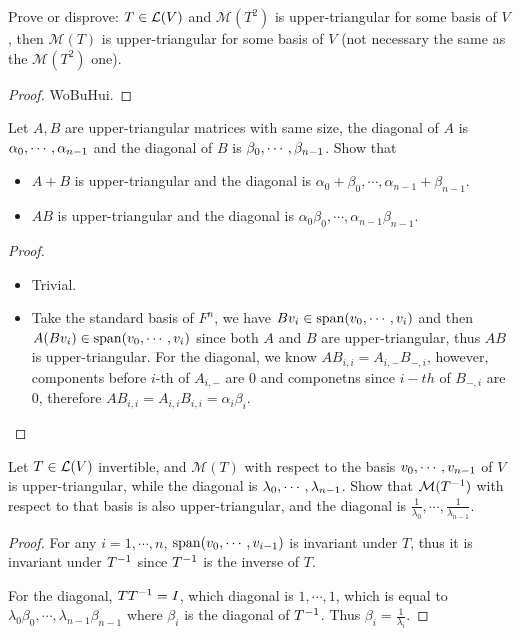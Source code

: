 \documentclass[../main.tex]{subfiles}
\begin{document}
\begin{exercise}
  Prove or disprove: $T \in \mathcal{L}(V)$ and $\mathcal{M}(T^2)$ is upper-triangular for some basis of $V$,
  then $\mathcal{M}(T)$ is upper-triangular for some basis of $V$ (not necessary the same as the $\mathcal{M}(T^2)$ one).
\end{exercise}
\begin{proof}
  WoBuHui.
\end{proof}

\begin{exercise}
  Let $A, B$ are upper-triangular matrices with same size,
  the diagonal of $A$ is $\alpha_0 , \cdots , \alpha_{n - 1}$
  and the diagonal of $B$ is $\beta_0 , \cdots , \beta_{n - 1}$.
  Show that
  \begin{itemize}
    \item $A + B$ is upper-triangular and the diagonal is $\alpha_0 + \beta_0, \cdots, \alpha_{n - 1} + \beta_{n - 1}$.
    \item $AB$ is upper-triangular and the diagonal is $\alpha_0\beta_0, \cdots, \alpha_{n - 1}\beta_{n - 1}$.
  \end{itemize}
\end{exercise}
\begin{proof}
  ~
  \begin{itemize}
    \item Trivial.
    \item Take the standard basis of $F^n$, we have $Bv_i \in \operatorname{span}(v_0 , \cdots , v_{i})$
          and then $A(Bv_i) \in \operatorname{span}(v_0 , \cdots , v_{i})$ since both $A$ and $B$
          are upper-triangular, thus $AB$ is upper-triangular.
          For the diagonal, we know $AB_{i, i} = A_{i, -} B_{-, i}$,
          however, components before $i$-th of $A_{i, -}$ are $0$ and componetns since $i-th$ of $B_{-, i}$ are $0$,
          therefore $AB_{i, i} = A_{i, i} B_{i, i} = \alpha_i \beta_i$.
  \end{itemize}
\end{proof}

\begin{exercise}
  Let $T \in \mathcal{L}(V)$ invertible, and $\mathcal{M}(T)$ with respect to the basis $v_0 , \cdots , v_{n - 1}$ of $V$
  is upper-triangular, while the diagonal is $\lambda_0 , \cdots , \lambda_{n - 1}$.
  Show that $\mathcal{M}(T^{-1})$ with respect to that basis is also upper-triangular,
  and the diagonal is $\frac{1}{\lambda_0}, \cdots, \frac{1}{\lambda_{n - 1}}$.
\end{exercise}
\begin{proof}
  For any $i = 1, \cdots, n$, $\operatorname{span}(v_0 , \cdots , v_{i - 1})$ is invariant under $T$, thus it is invariant under $T^{-1}$
  since $T^{-1}$ is the inverse of $T$.

  For the diagonal, $TT^{-1} = I$, which diagonal is $1, \cdots, 1$, which
  is equal to $\lambda_0 \beta_0, \cdots, \lambda_{n - 1} \beta_{n - 1}$
  where $\beta_i$ is the diagonal of $T^{-1}$.
  Thus $\beta_i = \frac{1}{\lambda_i}$.
\end{proof}
\end{document}
